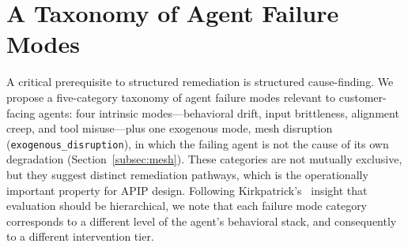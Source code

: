 \section{A Taxonomy of Agent Failure Modes}
\label{sec:taxonomy}

A critical prerequisite to structured remediation is structured cause-finding.
We propose a five-category taxonomy of agent failure modes relevant to
customer-facing agents: four intrinsic modes---behavioral drift, input
brittleness, alignment creep, and tool misuse---plus one exogenous mode,
mesh disruption (\texttt{exogenous\_disruption}), in which the failing agent is
not the cause of its own degradation
(Section~\ref{subsec:mesh}). These categories are not mutually exclusive, but they
suggest distinct remediation pathways, which is the operationally important
property for APIP design. Following Kirkpatrick's~\cite{kirkpatrick1994evaluating}
insight that evaluation should be hierarchical, we note that each failure mode
category corresponds to a different level of the agent's behavioral stack, and
consequently to a different intervention tier.

